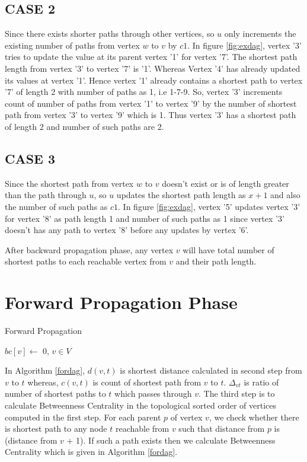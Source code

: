 \subsection{CASE 2}
Since there exists shorter paths through other vertices, so $u$ only increments the existing number of paths from vertex $w$ to $v$ by $c1$.
In figure \ref{fig:exdag}, vertex '3' tries to update the value at its parent vertex '1' for vertex '7'. The shortest path length from vertex '3' to vertex '7' is  '1'. Whereas Vertex '4' has already updated its values at vertex '1'. Hence vertex '1' already contains a shortest path to vertex '7' of length 2 with number of paths as 1, i.e 1-7-9.
So, vertex '3' increments count of number of paths from vertex '1' to vertex '9' by the number of shortest path from vertex '3' to vertex '9' which is 1. Thus vertex '3' has a shortest path of length 2 and number of such paths are 2.

\subsection{CASE 3}
Since the shortest path from vertex $w$ to $v$ doesn't exist or is of length greater than the path through $u$, so $u$ updates the shortest path length as $x + 1$ and also the number of such paths as $c1$.
In figure \ref{fig:exdag}, vertex '5' updates vertex '3' for vertex '8' as path length 1 and number of such paths as 1 since vertex '3' doesn't has any path to vertex '8' before any updates by vertex '6'. 

After backward propagation phase, any vertex $v$ will have total number of shortest paths to each reachable vertex from $v$ and their path length.
\section{Forward Propagation Phase}

\begin{algorithm}
\caption{Forward Propagation}
\label{fordag}
$bc[v] \leftarrow$ 0, $v \in V$\;

\end{algorithm}

In Algorithm \ref{fordag}, $d(v,t)$ is shortest distance calculated in second step from $v$ to $t$ whereas, $c(v,t)$ is count of shortest path from $v$ to $t$. $\Delta_{vt}$ is ratio of number of shortest paths to $t$ which passes through $v$. 
The third step is to calculate Betweenness Centrality in the topological sorted order of vertices computed in the first step. For each parent $p$ of vertex $v$, we check whether there is shortest path to any node $t$ reachable from $v$ such that distance from $p$ is (distance from $v$ + 1). If such a path exists then we calculate Betweenness Centrality which is given in Algorithm \ref{fordag}. 


